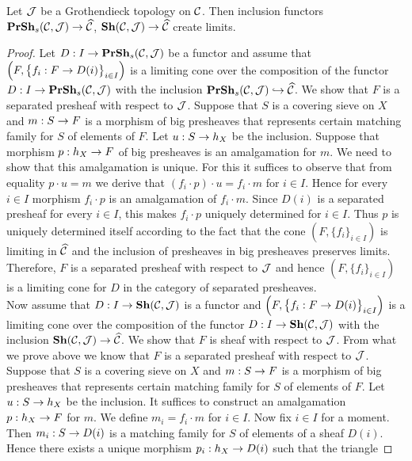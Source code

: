 \begin{theorem}\label{theorem:limitsinsheavesandseparatedpresheaves}
Let ${\mathcal J}$ be a Grothendieck topology on ${\mathcal C}$. Then inclusion functors $\mathbf{PrSh}_s({\mathcal C},{\mathcal J})\rightarrow \widehat{{\mathcal C}}$, $\mathbf{Sh}({\mathcal C},{\mathcal J})\rightarrow \widehat{{\mathcal C}}$ create limits.
\end{theorem}
\begin{proof}
Let $D:I\rightarrow \mathbf{PrSh}_s({\mathcal C},{\mathcal J})$ be a functor and assume that $\left(F,\big\{f_i:F\rightarrow D(i)\big\}_{i\in I}\right)$ is a limiting cone over the composition of the functor $D:I\rightarrow \mathbf{PrSh}_s({\mathcal C},{\mathcal J})$ with the inclusion $\mathbf{PrSh}_s({\mathcal C},{\mathcal J})\hookrightarrow \widehat{{\mathcal C}}$. We show that $F$ is a separated presheaf with respect to ${\mathcal J}$. Suppose that $S$ is a covering sieve on $X$ and $m:S\rightarrow F$ is a morphism of big presheaves that represents certain matching family for $S$ of elements of $F$. Let $u:S\rightarrow h_X$ be the inclusion. Suppose that morphism $p:h_X\rightarrow F$ of big presheaves is an amalgamation for $m$. We need to show that this amalgamation is unique. For this it suffices to observe that from equality $p\cdot u = m$ we derive that $(f_i\cdot p)\cdot u = f_i\cdot m$ for $i\in I$. Hence for every $i\in I$ morphism $f_i\cdot p$ is an amalgamation of $f_i\cdot m$. Since $D(i)$ is a separated presheaf for every $i\in I$, this makes $f_i\cdot p$ uniquely determined for $i\in I$. Thus $p$ is uniquely determined itself according to the fact that the cone $\left(F,\big\{f_i\big\}_{i\in I}\right)$ is limiting in $\widehat{{\mathcal C}}$ and the inclusion of presheaves in big presheaves preserves limits. Therefore, $F$ is a separated presheaf with respect to ${\mathcal J}$ and hence $\left(F,\big\{f_i\big\}_{i\in I}\right)$ is a limiting cone for $D$ in the category of separated presheaves.\\
Now assume that $D:I\rightarrow \mathbf{Sh}({\mathcal C},{\mathcal J})$ is a functor and $\left(F,\big\{f_i:F\rightarrow D(i)\big\}_{i\in I}\right)$ is a limiting cone over the composition of the functor $D:I\rightarrow \mathbf{Sh}({\mathcal C},{\mathcal J})$ with the inclusion $\mathbf{Sh}({\mathcal C},{\mathcal J})\rightarrow \widehat{{\mathcal C}}$. We show that $F$ is sheaf with respect to ${\mathcal J}$. From what we prove above we know that $F$ is a separated presheaf with respect to ${\mathcal J}$. Suppose that $S$ is a covering sieve on $X$ and $m:S\rightarrow F$ is a morphism of big presheaves that represents certain matching family for $S$ of elements of $F$. Let $u:S\rightarrow h_X$ be the inclusion. It suffices to construct an amalgamation $p:h_X\rightarrow F$ for $m$. We define $m_i = f_i \cdot m$ for $i\in I$. Now fix $i\in I$ for a moment. Then $m_i:S\rightarrow D(i)$ is a matching family for $S$ of elements of a sheaf $D(i)$. Hence there exists a unique morphism $p_i:h_X\rightarrow D(i)$ such that the triangle

\end{proof}
